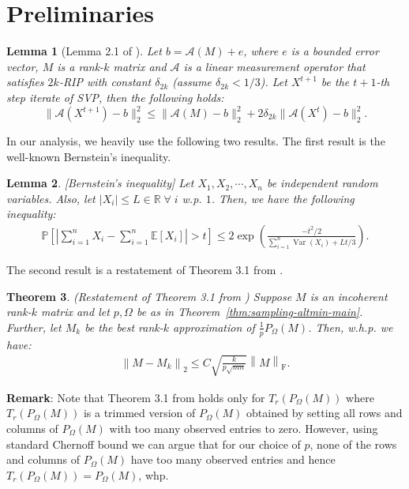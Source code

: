 \documentclass[11pt]{article}
\theoremstyle{plain}
\newtheorem{theorem}{Theorem}[section]
\newtheorem{lemma}[theorem]{Lemma}
\theoremstyle{definition}
\newcommand{\Var}{\operatorname{Var}}
\newcommand{\R}{\mathbb{R}}
\newcommand{\frob}[1]{\left\| {#1} \right\|_\text{F}}
\newcommand{\twonorm}[1]{\left\| {#1} \right\|_2}
\newcommand{\expec}[1]{\mathbb{E}\left[#1\right]}
\newcommand{\prob}[1]{\mathbb{P}\left[#1\right]}
\newcommand{\aff}{{\mathcal A}}
\begin{document}
\section{Preliminaries}
\begin{lemma}[Lemma 2.1 of \cite{JainMD10}]\label{lem:jmd}
  Let $b=\aff(M)+e$, where $e$ is a bounded error vector, $M$ is a rank-$k$ matrix and $\aff$ is a linear measurement operator that satisfies $2k$-RIP with constant $\delta_{2k}$ (assume $\delta_{2k}<1/3$). Let $X^{t+1}$ be the $t+1$-th step iterate of SVP, then the following holds:
$$\|\aff(X^{t+1})-b\|_2^2\leq \|\aff(M)-b\|_2^2 + 2\delta_{2k}\|\aff(X^t)-b\|_2^2.$$
\end{lemma}
In our analysis, we heavily use the following two results. The first result is the well-known  Bernstein's inequality.
\begin{lemma}\label{lemma:bernstein}[Bernstein's inequality]
  Let $X_1,X_2,\cdots,X_n$ be independent random variables. Also, let $\left|X_i\right| \leq L \in \R\; \forall \; i$ w.p. $1$. Then, we have the following inequality:{\small
\begin{align}\label{eqn:bernstein}
  \prob{\left|\sum_{i=1}^n X_i - \sum_{i=1}^n \expec{X_i}\right| > t} \leq 2\exp\left(\frac{-t^2/2}{\sum_{i=1}^n \Var\left(X_i\right) + Lt / 3}\right).
\end{align}}
\end{lemma}
The second result is a restatement of Theorem 3.1 from \cite{KeshavanOM2009}.%
\begin{theorem}\label{thm:KOM-firststepSVD}(Restatement of Theorem 3.1 from \cite{KeshavanOM2009})
  Suppose $M$ is an incoherent rank-$k$ matrix and let $p,\Omega$ be as in Theorem~\ref{thm:sampling-altmin-main}. Further, let $M_k$ be the best rank-$k$ approximation  of $\frac{1}{p}P_{\Omega}\left(M\right)$. Then, w.h.p. we have:
\begin{align}\label{eqn:KOM-firststepSVD}
  \twonorm{M - M_k} \leq C \sqrt{\frac{k}{p\sqrt{mn}}} \frob{M}.
\end{align}
\end{theorem}
\textbf{Remark}: Note that Theorem 3.1 from \cite{KeshavanOM2009} holds only for $T_r\left(P_{\Omega}(M)\right)$  where
$T_r\left(P_{\Omega}(M)\right)$ is a trimmed version of $P_{\Omega}(M)$ obtained by setting all rows and columns of $P_{\Omega}(M)$ with too many observed entries  to zero.
However, using standard Chernoff bound we can argue that for our choice of $p$, none of the rows and columns of $P_{\Omega}(M)$ have too many observed entries and hence $T_r\left(P_{\Omega}(M)\right)=P_{\Omega}(M)$, whp.
\end{document}
